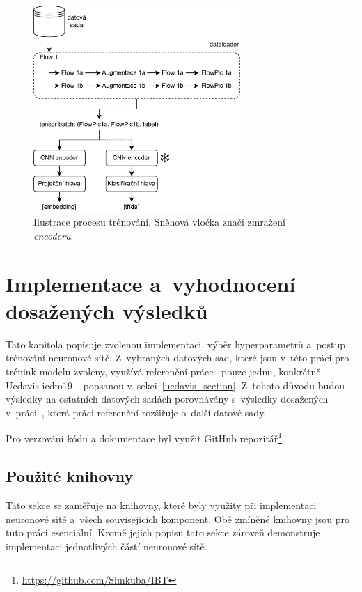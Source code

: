 \begin{figure}[H]
	\centering
	\includegraphics[width=0.7\textwidth]{obrazky-figures/training.png}
	\caption{Ilustrace procesu trénování. Sněhová vločka značí zmražení \textit{encoderu}.}
	\label{training_diagram}
\end{figure}

\chapter{Implementace a~vyhodnocení dosažených výsledků}
Tato kapitola popisuje zvolenou implementaci, výběr hyperparametrů a~postup trénování neuronové sítě. Z~vybraných datových sad, které jsou v~této práci pro trénink modelu zvoleny, využívá referenční práce~\cite{flow_monitoring} pouze jednu, konkrétně Ucdavis-icdm19~\cite{usdavis}, popsanou v~sekci~\ref{ucdavis_section}. Z~tohoto důvodu budou výsledky na ostatních datových sadách porovnávány s~výsledky dosažených v~práci~\cite{huawei_paper}, která práci referenční rozšiřuje o~další datové sady.

Pro verzování kódu a dokumentace byl využit GitHub repozitář\footnote{\url{https://github.com/Simkuba/IBT}}.

\section{Použité knihovny}
Tato sekce se zaměřuje na knihovny, které byly využity při implementaci neuronové sítě a~všech souvisejících komponent. Obě zmíněné knihovny jsou pro tuto práci esenciální. Kromě jejich popisu tato sekce zároveň demonstruje implementaci jednotlivých částí neuronové sítě.

